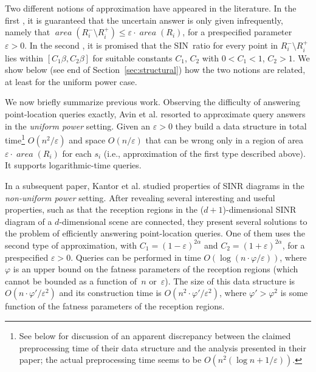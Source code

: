\documentclass[11pt]{article}
\theoremstyle{remark}
\DeclareMathOperator{\area}{\mathit{area}}
\let\eps\varepsilon
\begin{document}
Two different notions of approximation have appeared in the literature. In the first \cite{aeklpr-sdciawn-12,klpp-twn-11}, it is guaranteed that the uncertain answer is only given infrequently, namely that $\area(R_i^- \setminus R_i^+) \leq \eps \cdot \area (R_i)$, for a prespecified parameter $\eps>0$.  In the second \cite{klpp-twn-11}, it is promised that the SIN~ratio for every point in $R_i^- \setminus R_i^+$ lies within $[C_1 \beta,C_2 \beta]$ for suitable constants $C_1$, $C_2$ with $0<C_1<1$, $C_2>1$.
We show below (see end of Section~\ref{sec:structural}) how the two notions are related, at least for the uniform power case.

We now briefly summarize previous work. Observing the difficulty of answering point-location queries exactly, Avin et al. \cite{aeklpr-sdciawn-12} resorted to approximate query answers in the \emph{uniform power} setting.  Given an $\eps>0$ they build a data structure in total time\footnote{See below for discussion of an apparent discrepancy between the claimed preprocessing time of their data structure and the analysis presented in their paper; the actual preprocessing time seems to be $O(n^2(\log n + 1/\eps))$.}
$O(n^2/\eps)$ and space $O(n/\eps)$ that can be wrong only in a region of area $\eps\cdot\area(R_i)$ for each $s_i$ (i.e., approximation of the first type described above).  It supports logarithmic-time queries.

In a subsequent paper, Kantor et al. \cite{klpp-twn-11} studied properties of SINR diagrams in the \emph{non-uniform power} setting. After revealing several interesting and useful properties, such as that the reception regions in the ($d+1$)-dimensional SINR diagram of a $d$-dimensional scene are connected, they present several solutions to the problem of efficiently answering point-location queries.  One of them uses the second type of approximation, with $C_1=(1-\eps)^{2\alpha}$ and $C_2=(1+\eps)^{2\alpha}$, for a prespecified $\eps>0$.  Queries can be performed in time $O(\log(n \cdot \varphi / \eps))$, where $\varphi$ is an upper bound on the fatness parameters of the reception regions (which cannot be bounded as a function of~$n$ or~$\eps$). The size of this data structure is $O(n \cdot \varphi' / \eps^2)$ and its construction time is $O(n^2 \cdot \varphi' / \eps^2)$, where $\varphi' > \varphi^2$ is some function of the fatness parameters of the reception regions.
\end{document}
